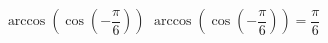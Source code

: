  {$\arccos\left(\cos\left(-\dfrac{\pi}{6}\right) \right)$ }
{ $\arccos\left(\cos\left(-\dfrac{\pi}{6}\right) \right) = \dfrac{\pi}{6}$ }
